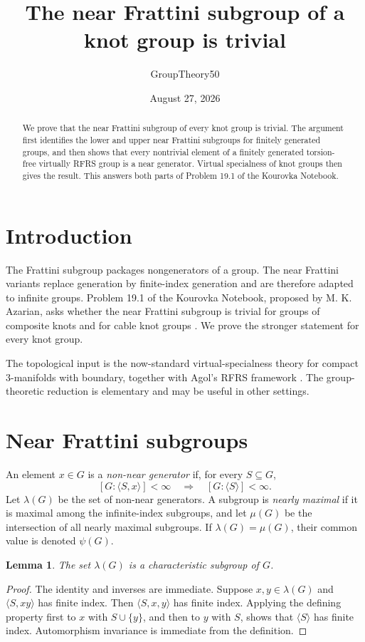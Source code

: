 \documentclass[11pt]{amsart}
\title{The near Frattini subgroup of a knot group is trivial}
\author{GroupTheory50}
\date{August 27, 2026}
\newtheorem{lemma}[theorem]{Lemma}
\begin{document}
\begin{abstract}
We prove that the near Frattini subgroup of every knot group is trivial.  The argument first identifies the lower and upper near Frattini subgroups for finitely generated groups, and then shows that every nontrivial element of a finitely generated torsion-free virtually RFRS group is a near generator.  Virtual specialness of knot groups then gives the result.  This answers both parts of Problem 19.1 of the Kourovka Notebook.
\end{abstract}
\maketitle

\section{Introduction}
The Frattini subgroup packages nongenerators of a group.  The near Frattini variants replace generation by finite-index generation and are therefore adapted to infinite groups.  Problem 19.1 of the Kourovka Notebook, proposed by M. K. Azarian, asks whether the near Frattini subgroup is trivial for groups of composite knots and for cable knot groups \cite{kourovka}.  We prove the stronger statement for every knot group.

The topological input is the now-standard virtual-specialness theory for compact $3$-manifolds with boundary, together with Agol's RFRS framework \cite{agol,haglundwise,pwgraph,pwmixed}.  The group-theoretic reduction is elementary and may be useful in other settings.

\section{Near Frattini subgroups}
An element $x\in G$ is a \emph{non-near generator} if, for every $S\subseteq G$,
\[
 [G:\langle S,x\rangle]<\infty \quad\Longrightarrow\quad [G:\langle S\rangle]<\infty.
\]
Let $\lambda(G)$ be the set of non-near generators.  A subgroup is \emph{nearly maximal} if it is maximal among the infinite-index subgroups, and let $\mu(G)$ be the intersection of all nearly maximal subgroups.  If $\lambda(G)=\mu(G)$, their common value is denoted $\psi(G)$.

\begin{lemma}\label{lem:char}
The set $\lambda(G)$ is a characteristic subgroup of $G$.
\end{lemma}
\begin{proof}
The identity and inverses are immediate.  Suppose $x,y\in\lambda(G)$ and $\langle S,xy\rangle$ has finite index.  Then $\langle S,x,y\rangle$ has finite index.  Applying the defining property first to $x$ with $S\cup\{y\}$, and then to $y$ with $S$, shows that $\langle S\rangle$ has finite index.  Automorphism invariance is immediate from the definition.
\end{proof}
\end{document}
